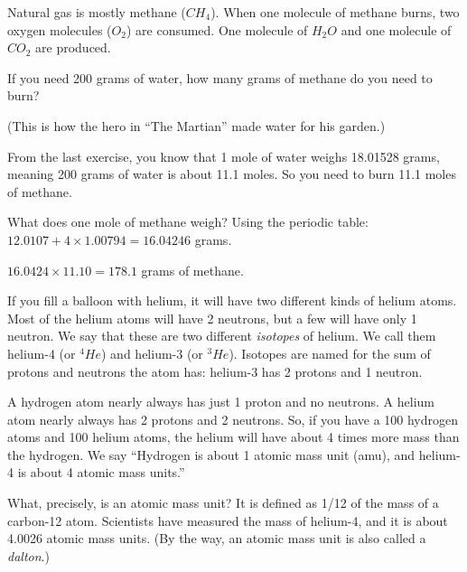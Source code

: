 
\begin{Exercise}[title={Burning Methane}, label=burning_methane]

Natural gas is mostly methane ($CH_4$). When one molecule of methane
burns, two oxygen molecules ($O_2$) are consumed. One molecule of
$H_2O$ and one molecule of $CO_2$ are produced.

If you need 200 grams of water, how many grams of methane do you need
to burn?

(This is how the hero in ``The Martian'' made water for his garden.)
\vspace{50mm}
\end{Exercise}

\begin{Answer}[ref=burning_methane]

From the last exercise, you know that 1 mole of water weighs 18.01528
grams, meaning 200 grams of water is about 11.1 moles. So you need to burn
11.1 moles of methane.

What does one mole of methane weigh? Using the periodic table:
$12.0107 + 4 \times 1.00794 = 16.04246$ grams.

$16.0424 \times 11.10 = 178.1$ grams of methane.

\end{Answer}


If you fill a balloon with helium, it will have two different
kinds of helium atoms. Most of the helium atoms will have 2 neutrons, but a
few will have only 1 neutron. We say that these are two different
\textit{isotopes} of helium. We call them helium-4 (or $^4He$) and
helium-3 (or $^3He$). Isotopes are named for the sum of protons and
neutrons the atom has: helium-3 has 2 protons and 1 neutron.

A hydrogen atom nearly always has just 1 proton and no neutrons. A
helium atom nearly always has 2 protons and 2 neutrons. So, if you
have a 100 hydrogen atoms and 100 helium atoms, the helium will have
about 4 times more mass than the hydrogen. We say ``Hydrogen is about
1 atomic mass unit (amu), and helium-4 is about 4 atomic mass
units.''

What, precisely, is an atomic mass unit? It is defined as 1/12 of
the mass of a carbon-12 atom. Scientists have measured the mass of
helium-4, and it is about 4.0026 atomic mass units. (By the way, an
atomic mass unit is also called a \textit{dalton}.)

